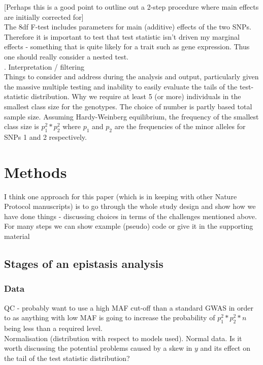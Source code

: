 \documentclass{article}
\begin{document}
[Perhaps this is a good point to outline out a 2-step procedure where main effects are initially corrected for] \\
The 8df F-test includes parameters for main (additive) effects of the two SNPs. Therefore it is important to test that test statistic isn't driven my marginal effects - something that is quite likely for a trait such as gene expression. Thus one should really consider a nested test.  \\
. Interpretation / filtering \\
\newline
Things to consider and address during the analysis and output, particularly given the massive multiple testing and inability to easily evaluate the tails of the test-statistic distribution. Why we require at least 5 (or more) individuals in the smallest class size for the genotypes. The choice of number is partly based total sample size. Assuming Hardy-Weinberg equilibrium, the frequency of the smallest class size is $p_1^2 * p_2^2$ where $p_1$ and $p_2$ are the frequencies of the minor alleles for SNPs 1 and 2 respectively.      
\newline
\section{Methods}

I think one approach for this paper (which is in keeping with other Nature Protocol manuscripts) is to go through the whole study design and show how we have done things - discussing choices in terms of the challenges mentioned above. For many steps we can show example (pseudo) code or give it in the supporting material  

\subsection{Stages of an epistasis analysis}

\subsubsection{Data}

QC - probably want to use a high MAF cut-off than a standard GWAS in order to as anything with low MAF is going to increase the probability of $p_1^2 * p_2^2 * n$ being less than a required level. \\
Normalisation (distribution with respect to models used). Normal data. Is it worth discussing the potential problems caused by a skew in $y$ and its effect on the tail of the test statistic distribution?  \\
\end{document}

